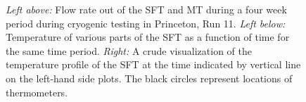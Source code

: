 \documentclass[
12pt, %
letterpaper, %
oneside, %
headinclude, footinclude, %
BCOR5mm, %
]{scrartcl}
\begin{document}
\begin{figure}[t]
\begin{center}
\end{center}
\caption[Cryogenic data from the MT and SFT]{\textit{Left above:} Flow rate out of the SFT and MT during a four week period during cryogenic testing in Princeton, Run 11. \textit{Left below:} Temperature of various parts of the SFT as a function of time for the same time period. \textit{Right:} A crude visualization of the temperature profile of the SFT at the time indicated by vertical line on the left-hand side plots. The black circles represent locations of thermometers.}
\label{fig:sft_hist}
\end{figure} 



\end{document}
